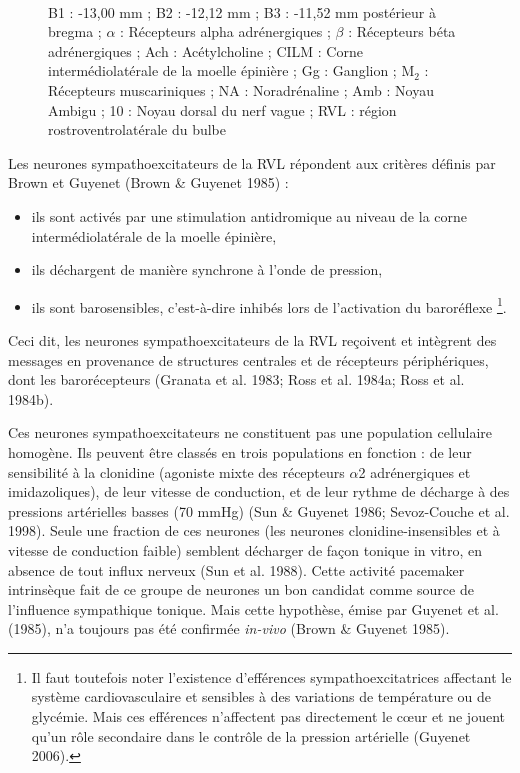 \documentclass[a4paper,12pt,twoside]{report}
\begin{document}
\begin{figure}[p]
{\protect\parbox[t]{18cm}{
\begin{small}
\\
B1 : -13,00 mm ; B2 : -12,12 mm ; B3 : -11,52 mm postérieur à bregma ; $\alpha$ : Récepteurs alpha adrénergiques ; $\beta$ : Récepteurs béta adrénergiques ; Ach : Acétylcholine ; CILM : Corne intermédiolatérale de la moelle épinière ; Gg : Ganglion ; M$_{2}$ : Récepteurs muscariniques ; NA : Noradrénaline ; Amb : Noyau Ambigu ; 10 : Noyau dorsal du nerf vague ; RVL : région rostroventrolatérale du bulbe
\end{small}}}

\label{Figure 7}

\end{figure}

Les neurones sympathoexcitateurs de la RVL répondent aux critères définis par Brown et Guyenet (Brown \& Guyenet 1985) : 

\begin{itemize}
\item ils sont activés par une stimulation antidromique au niveau de la corne intermédiolatérale de la moelle épinière,
\item ils déchargent de manière synchrone à l’onde de pression,
\item ils sont barosensibles, c’est-à-dire inhibés lors de l’activation du baroréflexe
\footnote{Il faut toutefois noter l’existence d’efférences sympathoexcitatrices affectant le système cardiovasculaire et sensibles à des variations de température ou de glycémie. Mais ces efférences n’affectent pas directement le cœur et ne jouent qu’un rôle secondaire dans le contrôle de la pression artérielle (Guyenet 2006).}.
\end{itemize}

Ceci dit, les neurones sympathoexcitateurs de la RVL reçoivent et intègrent des messages en provenance de structures centrales et de récepteurs périphériques, dont les barorécepteurs (Granata et al. 1983; Ross et al. 1984a; Ross et al. 1984b). 

Ces neurones sympathoexcitateurs ne constituent pas une population cellulaire homogène. Ils peuvent être classés en trois populations en fonction : de leur sensibilité à la clonidine (agoniste mixte des récepteurs $\alpha$2 adrénergiques et imidazoliques), de leur vitesse de conduction, et de leur rythme de décharge à des pressions artérielles basses (70 mmHg) (Sun \& Guyenet 1986; Sevoz-Couche et al. 1998). Seule une fraction de ces neurones (les neurones clonidine-insensibles et à vitesse de conduction faible) semblent décharger de façon tonique in vitro, en absence de tout influx nerveux (Sun et al. 1988). Cette activité pacemaker intrinsèque fait de ce groupe de neurones un bon candidat comme source de l’influence sympathique tonique. Mais cette hypothèse, émise par Guyenet et al. (1985), n’a toujours pas été confirmée \textit{in-vivo} (Brown \& Guyenet 1985).
\end{document}
